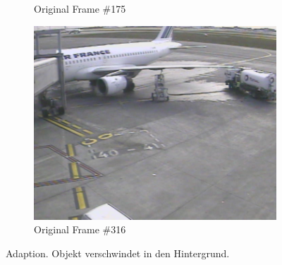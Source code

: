 \documentclass[]{scrartcl}
\begin{document}
\begin{figure}[h!]
\begin{subfigure}{.5\textwidth}
  \caption{Original Frame \#175}
  \label{fig:orig1}
\end{subfigure}%
\begin{subfigure}{.5\textwidth}
  \centering
  \includegraphics[width=.9\linewidth]{S36-A319-8_0316.jpeg}
  \caption{Original Frame \#316}
  \label{fig:orig2}
\end{subfigure}
\caption{Adaption. Objekt verschwindet in den Hintergrund.}
\label{fig:adaption}
\end{figure}
\end{document}
